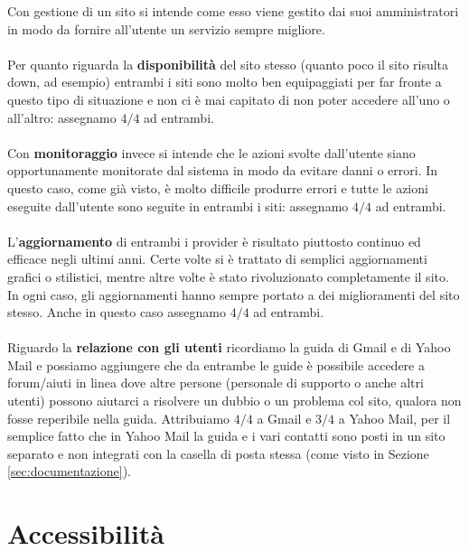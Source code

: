 		Con gestione di un sito si intende come esso viene gestito dai suoi amministratori in modo da fornire all'utente un servizio sempre migliore.\\
		\\
		Per quanto riguarda la \textbf{disponibilità} del sito stesso (quanto poco il sito risulta down, ad esempio) entrambi i siti sono molto ben equipaggiati per far fronte a questo tipo di situazione e non ci è mai capitato di non poter accedere  all'uno o all'altro: assegnamo $4/4$ ad entrambi.\\
		\\
		Con \textbf{monitoraggio} invece si intende che le azioni svolte dall'utente siano opportunamente monitorate dal sistema in modo da evitare danni o errori. In questo caso, come già visto, è molto difficile  produrre errori e tutte le azioni eseguite dall'utente sono seguite in entrambi i siti: assegnamo $4/4$ ad entrambi.\\
		\\
		L'\textbf{aggiornamento} di entrambi i provider è risultato piuttosto continuo ed efficace negli ultimi anni. Certe volte si è trattato di semplici aggiornamenti grafici o stilistici,  mentre altre volte è stato rivoluzionato completamente il sito. In ogni caso, gli aggiornamenti hanno sempre portato a dei miglioramenti del sito stesso. Anche in questo caso assegnamo $4/4$ ad entrambi.\\
		\\
		Riguardo la \textbf{relazione con gli utenti} ricordiamo la guida di Gmail e di Yahoo Mail e possiamo aggiungere che da entrambe le guide è possibile accedere a forum/aiuti in linea dove altre persone (personale di supporto o anche altri utenti) possono aiutarci a risolvere un dubbio o un problema col sito, qualora non fosse reperibile nella guida. Attribuiamo $4/4$ a Gmail e $3/4$ a Yahoo Mail, per il semplice fatto che in Yahoo Mail la  guida e i vari contatti sono posti in un sito separato e non integrati con la casella di posta stessa (come visto in Sezione \ref{sec:documentazione}).
	
	\section{Accessibilit\`{a}} \label{sec:accessibilità}
	
